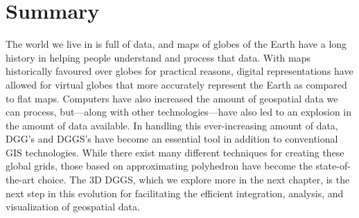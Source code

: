 \section{Summary}
The world we live in is full of data, and maps of globes of the Earth have a long history in helping people understand and process that data.
With maps historically favoured over globes for practical reasons, digital representations have allowed for virtual globes that more accurately represent the Earth as compared to flat maps.
Computers have also increased the amount of geospatial data we can process, but---along with other technologies---have also led to an explosion in the amount of data available.
In handling this ever-increasing amount of data, DGG's and DGGS's have become an essential tool in addition to conventional GIS technologies.
While there exist many different techniques for creating these global grids, those based on approximating polyhedron have become the state-of-the-art choice. The 3D DGGS, which we explore more in the next chapter, is the next step in this evolution for facilitating the efficient integration, analysis, and visualization of geospatial data.


